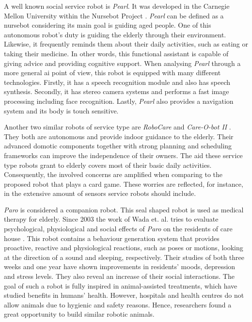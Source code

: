 A well known social service robot is \emph{Pearl}.
It was developed in the Carnegie Mellon University within the Nursebot Project \cite{Pollack2002}.
\emph{Pearl} can be defined as a nursebot considering its main goal is guiding aged people.
One of this autonomous robot's duty is guiding the elderly through their environment.
Likewise, it frequently reminds them about their daily activities, such as eating or taking their medicine.
In other words, this functional assistant is capable of giving advice and providing cognitive support.
When analysing \emph{Pearl} through a more general \gls{ai} point of view, this robot is equipped with many different technologies.
Firstly, it has a speech recognition module and also has speech synthesis.
Secondly, it has stereo camera systems and performs a fast image processing including face recognition.
Lastly, \emph{Pearl} also provides a navigation system and its body is touch sensitive.

Another two similar robots of service type are \emph{RoboCare} \cite{Bahadori} and \emph{Care-O-bot II} \cite{Graf2004}.
They both are autonomous and provide indoor guidance to the elderly.
Their advanced domotic components together with strong planning and scheduling frameworks can improve the independence of their owners.
The aid these service type robots grant to elderly covers most of their basic daily activities.
Consequently, the involved concerns are amplified when comparing to the proposed robot that plays a card game.
These worries are reflected, for instance, in the extensive amount of sensors service robots should include.

\emph{Paro} is considered a companion robot.
This seal shaped robot is used as medical therapy for elderly.
Since 2003 the work of Wada et. al. tries to evaluate psychological, physiological and social effects of \emph{Paro} on the residents of care house \cite{Wada2007,Wada2005,Wada2003}.
This robot contains a behaviour generation system that provides proactive, reactive and physiological reactions, such as poses or motions, looking at the direction of a sound and sleeping, respectively.
Their studies of both three weeks and one year have shown improvements in residents' moods, depression and stress levels.
They also reveal an increase of their social interactions.
The goal of such a robot is fully inspired in animal-assisted treatments, which have studied benefits in humans' health.
However, hospitals and health centres do not allow animals due to hygienic and safety reasons.
Hence, researchers found a great opportunity to build similar robotic animals.

